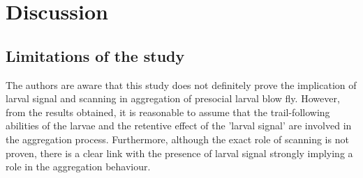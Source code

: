\clearpage           
	\section{Discussion}   
    
			\subsection{Limitations of the study}   
The authors are aware that this study does not definitely prove the implication of larval signal and scanning in aggregation of presocial larval blow fly. However, from the results obtained, it is reasonable to assume that the trail-following abilities of the larvae and the retentive effect of the 'larval signal' are involved in the aggregation process. Furthermore, although the exact role of scanning is not proven, there is a clear link with the presence of larval signal strongly implying a role in the aggregation behaviour.            
            
